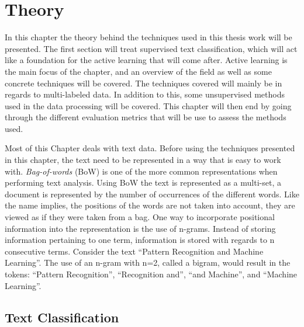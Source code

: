 \chapter{Theory}
\label{cha:theory}

In this chapter the theory behind the techniques used in this thesis work will be presented.
The first section will treat supervised text classification, which will act like a foundation for the active learning that will come after.
Active learning is the main focus of the chapter, and an overview of the field as well as some concrete techniques will be covered.
The techniques covered will mainly be in regards to multi-labeled data.
In addition to this, some unsupervised methods used in the data processing will be covered.
This chapter will then end by going through the different evaluation metrics that will be use to assess the methods used.

Most of this Chapter deals with text data.
Before using the techniques presented in this chapter, the text need to be represented in a way that is easy to work with.
\textit{Bag-of-words} (BoW) is one of the more common representations when performing text analysis. 
Using BoW the text is represented as a multi-set, a document is represented by the number of occurrences of the different words. 
Like the name implies, the positions of the words are not taken into account, they are viewed as if they were taken from a bag. 
One way to incorporate positional information into the representation is the use of n-grams.
Instead of storing information pertaining to one term, information is stored with regards to n consecutive terms.
Consider the text ``Pattern Recognition and Machine Learning''.
The use of an n-gram with n=2, called a bigram, would result in the tokens: ``Pattern Recognition'', ``Recognition and'', ``and Machine'', and ``Machine Learning''.

\section{Text Classification}\label{sec:text-classification}

